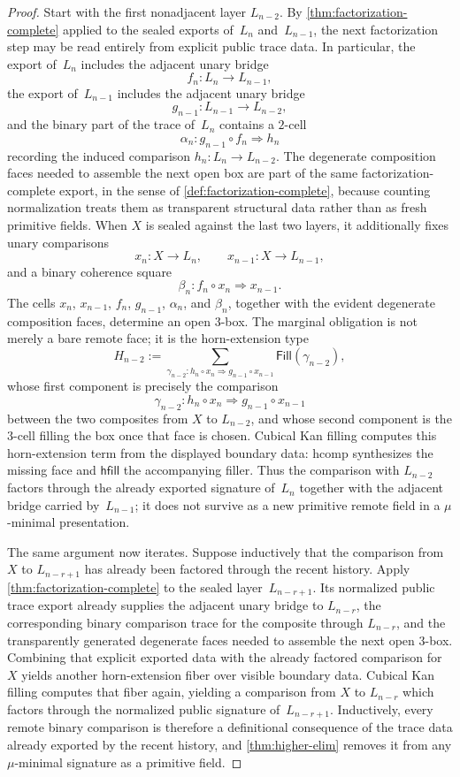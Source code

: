 \documentclass{lmcs}
\newcommand{\hcomp}{\mathrm{hcomp}}
\begin{document}
\begin{proof}
Start with the first nonadjacent layer $L_{n-2}$. By
\autoref{thm:factorization-complete} applied to the sealed exports of~$L_n$
and~$L_{n-1}$, the next factorization step may be read entirely from explicit
public trace data. In particular, the export of~$L_n$ includes the adjacent
unary bridge
\[
  f_n : L_n \to L_{n-1},
\]
the export of~$L_{n-1}$ includes the adjacent unary bridge
\[
  g_{n-1} : L_{n-1} \to L_{n-2},
\]
and the binary part of the trace of~$L_n$ contains a $2$-cell
\[
  \alpha_n : g_{n-1}\circ f_n \Rightarrow h_n
\]
recording the induced comparison $h_n : L_n \to L_{n-2}$. The degenerate
composition faces needed to assemble the next open box are part of the same
factorization-complete export, in the sense of
\autoref{def:factorization-complete}, because counting normalization treats
them as transparent structural data rather than as fresh primitive fields. When
$X$ is sealed against the last two layers, it additionally fixes unary
comparisons
\[
  x_n : X \to L_n,
  \qquad
  x_{n-1} : X \to L_{n-1},
\]
and a binary coherence square
\[
  \beta_n : f_n \circ x_n \Rightarrow x_{n-1}.
\]
The cells $x_n$, $x_{n-1}$, $f_n$, $g_{n-1}$, $\alpha_n$, and $\beta_n$, together with the evident degenerate composition faces, determine an open $3$-box. The marginal obligation is not merely a bare remote face; it is the horn-extension type
\[
  H_{n-2}
  :=
  \sum_{\gamma_{n-2} : h_n \circ x_n \Rightarrow g_{n-1}\circ x_{n-1}}
  \mathsf{Fill}(\gamma_{n-2}),
\]
whose first component is precisely the comparison
\[
  \gamma_{n-2} : h_n \circ x_n \Rightarrow g_{n-1}\circ x_{n-1}
\]
between the two composites from $X$ to $L_{n-2}$, and whose second component
is the $3$-cell filling the box once that face is chosen. Cubical Kan filling
computes this horn-extension term from the displayed boundary data: $\hcomp$
synthesizes the missing face and $\mathsf{hfill}$ the accompanying filler.
Thus the comparison with $L_{n-2}$ factors through the already exported
signature of~$L_n$ together with the adjacent bridge carried by~$L_{n-1}$; it
does not survive as a new primitive remote field in a $\mu$-minimal
presentation.

The same argument now iterates. Suppose inductively that the comparison from
$X$ to $L_{n-r+1}$ has already been factored through the recent history. Apply
\autoref{thm:factorization-complete} to the sealed layer~$L_{n-r+1}$. Its
normalized public trace export already supplies the adjacent unary bridge to
$L_{n-r}$, the corresponding binary comparison trace for the composite through
$L_{n-r}$, and the transparently generated degenerate faces needed to assemble
the next open $3$-box. Combining that explicit exported data with the already
factored comparison for~$X$ yields another horn-extension fiber over visible
boundary data. Cubical Kan filling computes that fiber again, yielding a
comparison from $X$ to $L_{n-r}$ which factors through the normalized public
signature of~$L_{n-r+1}$. Inductively, every remote binary comparison is
therefore a definitional consequence of the trace data already exported by the
recent history, and \autoref{thm:higher-elim} removes it from any
$\mu$-minimal signature as a primitive field.
\end{proof}
\end{document}
